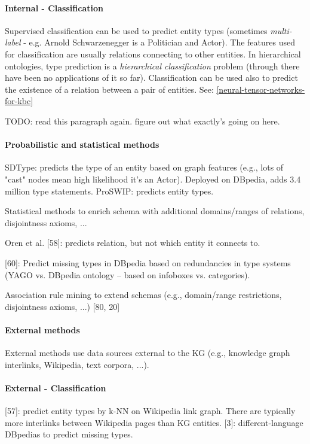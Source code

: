 \paragraph{Internal - Classification}
Supervised classification can be used to predict entity types (sometimes
\textit{multi-label} - e.g. Arnold Schwarzenegger is a Politician and Actor).
The features used for classification are usually relations connecting to other
entities. In hierarchical ontologies, type prediction is a \textit{hierarchical
classification} problem (through there have been no applications of it so far).
Classification can be used also to predict the existence of a relation between
a pair of entities.
See: \ref{neural-tensor-networks-for-kbc}

TODO: read this paragraph again. figure out what exactly's going on here.

\paragraph{Probabilistic and statistical methods}
SDType: predicts the type of an entity based on graph features (e.g., lots of
"cast" nodes mean high likelihood it's an Actor). Deployed on DBpedia, adds 3.4
million type statements.
ProSWIP: predicts entity types.

Statistical methods to enrich schema with additional domains/ranges of
relations, disjointness axioms, ...

Oren et al. [58]: predicts relation, but not which entity it connects to.

[60]: Predict missing types in DBpedia based on redundancies in type systems
(YAGO vs. DBpedia ontology -- based on infoboxes vs. categories).

Association rule mining to extend schemas (e.g., domain/range restrictions,
disjointness axioms, ...) [80, 20]

\paragraph{External methods}
External methods use data sources external to the KG (e.g., knowledge graph
interlinks, Wikipedia, text corpora, ...).

\paragraph{External - Classification}
[57]: predict entity types by k-NN on Wikipedia link graph.
There are typically more interlinks between Wikipedia pages than KG entities.
[3]: different-language DBpedias to predict missing types.

